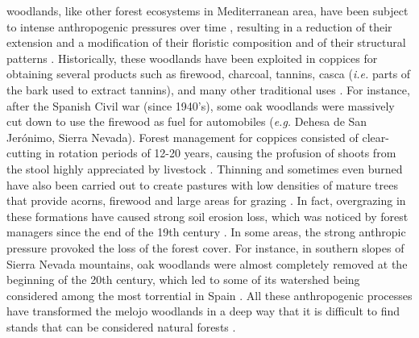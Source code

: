 \Qp woodlands, like other forest ecosystems in Mediterranean area, have been subject to intense anthropogenic pressures over time \autocite{GarciaJimenez20099230Robledales}, resulting in a reduction of their extension and a modification of their floristic composition \autocites{Serradaetal1992CoppiceSystem,Gavilanetal2000EffectsDisturbance,PerezLuqueetal2021EcologicalDiversity} and of their structural patterns \autocites{Calvoetal1999PostfireSuccession,Tarregaetal2006ForestStructure}. Historically, these woodlands have been exploited in coppices for obtaining several products such as firewood, charcoal, tannins, casca (\emph{i.e.} parts of the bark used to extract tannins), and many other traditional uses \autocites{RuizdelaTorre2006FloraMayor,SanchezPalomaresetal2008EstacionesEcologicas}. For instance, after the Spanish Civil war (since 1940's), some oak woodlands were massively cut down to use the firewood as fuel for automobiles (\emph{e.g.} Dehesa de San Jerónimo, Sierra Nevada)\autocite{Prieto1975BosquesSierra}. Forest management for coppices consisted of clear-cutting in rotation periods of 12-20 years, causing the profusion of shoots from the stool highly appreciated by livestock \autocite{Bravoetal2008SelviculturaMontes}. Thinning  and sometimes even burned have also been carried out to create pastures with low densities of mature trees that provide acorns, firewood and large areas for grazing \autocites{HerreraCalvo2016UsoPastoral,Alvarezetal2009CambiosEstructura,ValbuenaCarabanaGil2017CentenaryCoppicing}. In fact, overgrazing in these formations have caused strong soil erosion loss, which was noticed by forest managers since the end of the 19th century \autocites{Laguna1872ComisionFlora}. In some areas, the strong anthropic pressure provoked the loss of the forest cover. For instance, in southern slopes of Sierra Nevada mountains, oak woodlands were almost completely removed at the beginning of the 20th century, which led to some of its watershed being considered among the most torrential in Spain  \autocites{RomeroZurbano1909DivisionHidrologicoforestal}. All these anthropogenic processes have transformed the melojo woodlands in a deep way that it is difficult to find stands that can be considered natural forests  \autocites{RuizdelaTorre2006FloraMayor}. 

